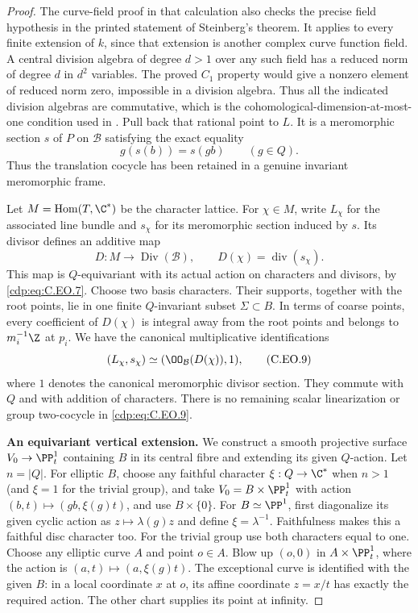 \begin{proof}
The curve-field proof in that calculation also
checks the precise field hypothesis in the
printed statement of Steinberg's theorem.
It applies to every finite extension of $k$,
since that extension is another complex curve
function field. A central division algebra
of degree $d>1$ over any such field has a
reduced norm of degree $d$ in $d^2$ variables.
The proved $C_1$ property would give a nonzero
element of reduced norm zero, impossible in
a division algebra. Thus all the indicated
division algebras are commutative, which is
the cohomological-dimension-at-most-one
condition used in \cite[Theorem~1.9]{Steinberg1965}.
Pull back that rational point to $L$.
It is a meromorphic section $s$ of $P$ on
$\mathcal B$ satisfying the exact equality
\[
                         g(s(b))=s(gb)
                              \qquad(g\in Q).        \tag{C.EO.7}\label{cdp:eq:C.EO.7}
\]
Thus the translation cocycle has been retained
in a genuine invariant meromorphic frame.

Let $M=\operatorname{Hom}(T,\C^*)$ be the
character lattice. For $\chi\in M$, write
$L_\chi$ for the associated line bundle and
$s_\chi$ for its meromorphic section induced
by $s$. Its divisor defines an additive map
\[
 D:M\longrightarrow\operatorname{Div}(\mathcal B),
       \qquad D(\chi)=\operatorname{div}(s_\chi).
                                                               \tag{C.EO.8}\label{cdp:eq:C.EO.8}
\]
This map is $Q$-equivariant with its actual
action on characters and divisors, by \eqref{cdp:eq:C.EO.7}.
Choose two basis characters. Their supports,
together with the root points, lie in one
finite $Q$-invariant subset $\Sigma\subset B$.
In terms of coarse points, every coefficient
of $D(\chi)$ is integral away from the root
points and belongs to $m_i^{-1}\Z$ at $p_i$.
We have the canonical multiplicative
identifications
\[
          (L_\chi,s_\chi)
                   \simeq(\OO_{\mathcal B}(D(\chi)),1),
                                                               \tag{C.EO.9}\label{cdp:eq:C.EO.9}
\]
where $1$ denotes the canonical meromorphic
divisor section. They commute with $Q$ and
with addition of characters. There is no
remaining scalar linearization or group
two-cocycle in \eqref{cdp:eq:C.EO.9}.

\par\medskip\noindent\textbf{An equivariant vertical extension.}
We construct a smooth projective surface
$V_0\to\PP^1_t$ containing $B$ in its
central fibre and extending its given
$Q$-action. Let $n=|Q|$.
For elliptic $B$, choose any faithful
character $\xi:Q\to\C^*$ when $n>1$
(and $\xi=1$ for the trivial group),
and take $V_0=B\times\PP^1_t$
with action $(b,t)\mapsto(gb,\xi(g)t)$,
and use $B\times\{0\}$.
For $B\simeq\PP^1$, first diagonalize
its given cyclic action as
$z\mapsto\lambda(g)z$ and define
$\xi=\lambda^{-1}$. Faithfulness makes
this a faithful disc character too.
For the trivial group use both
characters equal to one. Choose any
elliptic curve $A$ and point $o\in A$.
Blow up $(o,0)$ in $A\times\PP^1_t$,
where the action is
$(a,t)\mapsto(a,\xi(g)t)$.
The exceptional curve is identified with
the given $B$: in a local coordinate $x$
at $o$, its affine coordinate $z=x/t$
has exactly the required action. The
other chart supplies its point at infinity.


\end{proof}
